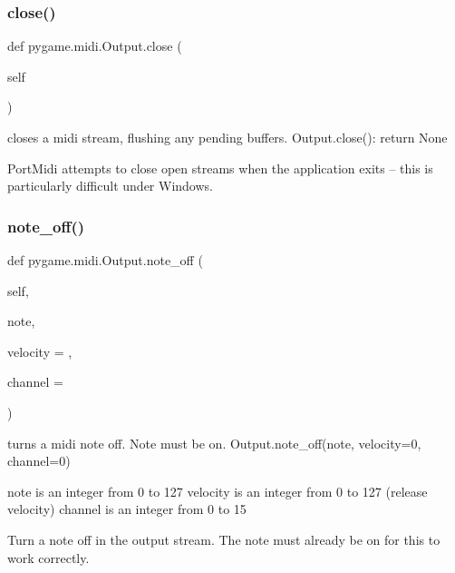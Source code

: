 \subsubsection{\texorpdfstring{close()}{close()}}
{\footnotesize\ttfamily def pygame.\+midi.\+Output.\+close (\begin{DoxyParamCaption}\item[{}]{self }\end{DoxyParamCaption})}

\begin{DoxyVerb}closes a midi stream, flushing any pending buffers.
Output.close(): return None

PortMidi attempts to close open streams when the application
exits -- this is particularly difficult under Windows.
\end{DoxyVerb}
 \mbox{\label{classpygame_1_1midi_1_1_output_a9a99990dbc2e8354f8a1a3023f318646}} 
\subsubsection{\texorpdfstring{note\+\_\+off()}{note\_off()}}
{\footnotesize\ttfamily def pygame.\+midi.\+Output.\+note\+\_\+off (\begin{DoxyParamCaption}\item[{}]{self,  }\item[{}]{note,  }\item[{}]{velocity = {},  }\item[{}]{channel = {} }\end{DoxyParamCaption})}

\begin{DoxyVerb}turns a midi note off.  Note must be on.
Output.note_off(note, velocity=0, channel=0)

note is an integer from 0 to 127
velocity is an integer from 0 to 127 (release velocity)
channel is an integer from 0 to 15

Turn a note off in the output stream.  The note must already
be on for this to work correctly.
\end{DoxyVerb}
 \mbox{\label{classpygame_1_1midi_1_1_output_afb6425f4918bfeb29b4abe254c8a2f46}} 
